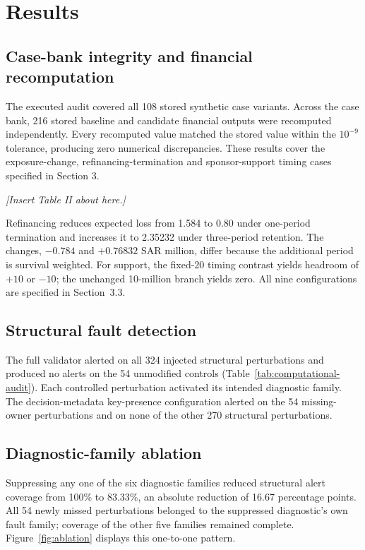 \documentclass[11pt,a4paper]{article}
\begin{document}
\section{Results}

\subsection{Case-bank integrity and financial recomputation}

The executed audit covered all 108 stored synthetic case variants. Across the case bank, 216 stored baseline and candidate financial outputs were recomputed independently. Every recomputed value matched the stored value within the $10^{-9}$ tolerance, producing zero numerical discrepancies. These results cover the exposure-change, refinancing-termination and sponsor-support timing cases specified in Section 3.

\par\noindent\textit{[Insert Table II about here.]}\label{tab:computational-audit}\par

Refinancing reduces expected loss from 1.584 to 0.80 under one-period termination and increases it to 2.35232 under three-period retention. The changes, $-0.784$ and $+0.76832$ SAR million, differ because the additional period is survival weighted. For support, the fixed-20 timing contrast yields headroom of $+10$ or $-10$; the unchanged 10-million branch yields zero. All nine configurations are specified in Section~3.3.

\subsection{Structural fault detection}

The full validator alerted on all 324 injected structural perturbations and produced no alerts on the 54 unmodified controls (Table~\ref{tab:computational-audit}). Each controlled perturbation activated its intended diagnostic family. The decision-metadata key-presence configuration alerted on the 54 missing-owner perturbations and on none of the other 270 structural perturbations.

\subsection{Diagnostic-family ablation}

Suppressing any one of the six diagnostic families reduced structural alert coverage from 100\% to 83.33\%, an absolute reduction of 16.67 percentage points. All 54 newly missed perturbations belonged to the suppressed diagnostic's own fault family; coverage of the other five families remained complete. Figure~\ref{fig:ablation} displays this one-to-one pattern.
\end{document}
